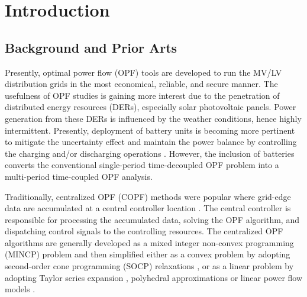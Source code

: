 \documentclass{article}
\begin{document}
\section{Introduction}

\subsection{Background and Prior Arts}
Presently, optimal power flow (OPF) tools are developed to run the MV/LV distribution grids in the most economical, reliable, and secure manner. The usefulness of OPF studies is gaining more interest due to the penetration of distributed energy resources (DERs), especially solar photovoltaic panels. Power generation from these DERs is influenced by the weather conditions, hence highly intermittent. Presently, deployment of battery units is becoming more pertinent to mitigate the uncertainty effect and maintain the power balance by controlling the charging and/or discharging operations \cite{tgangwar}. However, the inclusion of batteries converts the conventional single-period time-decoupled OPF problem into a multi-period time-coupled OPF analysis.

Traditionally, centralized OPF (COPF) methods were popular where grid-edge data are accumulated at a central controller location \cite{spaul}. The central controller is responsible for processing the accumulated data, solving the OPF algorithm, and dispatching control signals to the controlling resources. The centralized OPF algorithms are generally developed as a mixed integer non-convex programming (MINCP) problem and then simplified either as a convex problem by adopting second-order cone programming (SOCP) relaxations \cite{Wei} \cite{Chowdhury}, or as a linear problem by adopting Taylor series expansion \cite{spaul}, polyhedral approximations \cite{Guo} or linear power flow models \cite{Yuan}.

\end{document}
